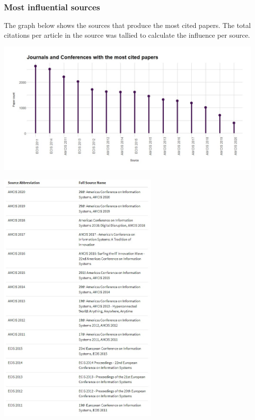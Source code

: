 \documentclass[
  letterpaper,
  DIV=11,
  numbers=noendperiod]{scrartcl}
\begin{document}
\hypertarget{most-influential-sources}{%
\subsubsection{Most influential
sources}\label{most-influential-sources}}

The graph below shows the sources that produce the most cited papers.
The total citations per article in the source was tallied to calculate
the influence per source.

\includegraphics[width=5.72917in,height=\textheight]{images/InfJournalsandConfrMostPapersPublished.jpg}

\includegraphics[width=3.125in,height=\textheight]{images/infSourceAbrv.jpg}
\end{document}
